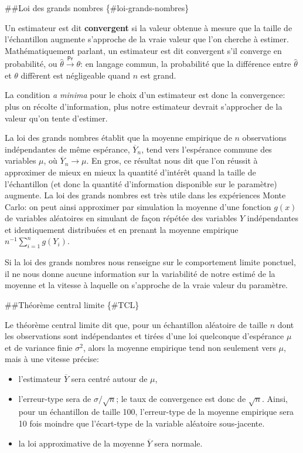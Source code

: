 \documentclass[
  11pt,
  letterpaper,
]{scrbook}
\providecommand{\tightlist}{%
  \setlength{\itemsep}{0pt}\setlength{\parskip}{0pt}}\usepackage{longtable,booktabs,array}
\theoremstyle{definition}
\theoremstyle{definition}
\theoremstyle{remark}
\begin{document}
\#\#Loi des grands nombres \{\#loi-grands-nombres\}

Un estimateur est dit \textbf{convergent} si la valeur obtenue à mesure
que la taille de l'échantillon augmente s'approche de la vraie valeur
que l'on cherche à estimer. Mathématiquement parlant, un estimateur est
dit convergent s'il converge en probabilité, ou
\(\hat{\theta} \stackrel{\mathsf{Pr}}{\to} \theta\): en langage commun,
la probabilité que la différence entre \(\hat{\theta}\) et \(\theta\)
diffèrent est négligeable quand \(n\) est grand.

La condition \emph{a minima} pour le choix d'un estimateur est donc la
convergence: plus on récolte d'information, plus notre estimateur
devrait s'approcher de la valeur qu'on tente d'estimer.

La loi des grands nombres établit que la moyenne empirique de \(n\)
observations indépendantes de même espérance, \(\overline{Y}_n\), tend
vers l'espérance commune des variables \(\mu\), où
\(\overline{Y}_n \rightarrow \mu\). En gros, ce résultat nous dit que
l'on réussit à approximer de mieux en mieux la quantité d'intérêt quand
la taille de l'échantillon (et donc la quantité d'information disponible
sur le paramètre) augmente. La loi des grands nombres est très utile
dans les expériences Monte Carlo: on peut ainsi approximer par
simulation la moyenne d'une fonction \(g(x)\) de variables aléatoires en
simulant de façon répétée des variables \(Y\) indépendantes et
identiquement distribuées et en prenant la moyenne empirique
\(n^{-1} \sum_{i=1}^n g(Y_i)\).

Si la loi des grands nombres nous renseigne sur le comportement limite
ponctuel, il ne nous donne aucune information sur la variabilité de
notre estimé de la moyenne et la vitesse à laquelle on s'approche de la
vraie valeur du paramètre.

\#\#Théorème central limite \{\#TCL\}

Le théorème central limite dit que, pour un échantillon aléatoire de
taille \(n\) dont les observations sont indépendantes et tirées d'une
loi quelconque d'espérance \(\mu\) et de variance finie \(\sigma^2\),
alors la moyenne empirique tend non seulement vers \(\mu\), mais à une
vitesse précise:

\begin{itemize}
\tightlist
\item
  l'estimateur \(\overline{Y}\) sera centré autour de \(\mu\),
\item
  l'erreur-type sera de \(\sigma/\sqrt{n}\); le taux de convergence est
  donc de \(\sqrt{n}\). Ainsi, pour un échantillon de taille 100,
  l'erreur-type de la moyenne empirique sera 10 fois moindre que
  l'écart-type de la variable aléatoire sous-jacente.
\item
  la loi approximative de la moyenne \(\overline{Y}\) sera normale.
\end{itemize}
\end{document}
